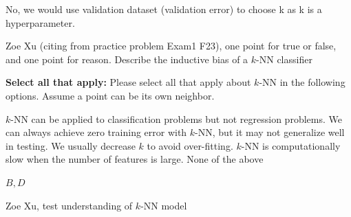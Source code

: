 \begin{parts}
\begin{subparts}
    \begin{soln}
    No, we would use validation dataset (validation error) to choose k as k is a hyperparameter.
    \end{soln}
    \begin{qauthor}
        Zoe Xu (citing from practice problem Exam1 F23), one point for true or false, and one point for reason.
        Describe the inductive bias of a $k$-NN classifier
    \end{qauthor}

    \subpart[3] \textbf{Select all that apply:} Please select all that apply about $k$-NN in the following options. Assume a point can be its own neighbor.
    \checkboxchar{$\Box$} \checkedchar{$\blacksquare$} %
    \begin{checkboxes}
     \choice $k$-NN can be applied to classification problems but not regression problems.
     \choice We can always achieve zero training error with $k$-NN, but it may not generalize well in testing.
     \choice We usually decrease $k$ to avoid over-fitting.
     \choice $k$-NN is computationally slow when the number of features is large.
     \choice None of the above
    \end{checkboxes}
    \begin{soln}
    $B, D$
    \end{soln}
    \begin{qauthor}
        Zoe Xu, test understanding of $k$-NN model
    \end{qauthor}
\end{subparts}
\end{parts}

